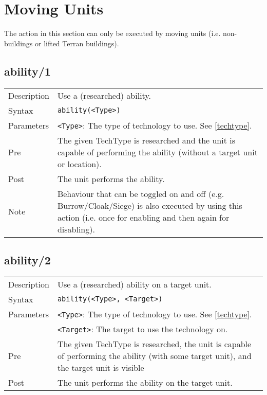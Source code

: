 \section{Moving Units}
The action in this section can only be executed by moving units (i.e. non-buildings or lifted Terran buildings).

\subsection{ability/1}
\begin{tabularx}{\textwidth}{lX}
 Description & Use a (researched) ability. \\
 Syntax & \verb|ability(<Type>)| \\
 Parameters & \verb|<Type>|: The type of technology to use. See \ref{techtype}. \\
 Pre & The given TechType is researched and the unit is capable of performing the ability (without a target unit or location). \\
 Post & The unit performs the ability. \\
 Note & Behaviour that can be toggled on and off (e.g. Burrow/Cloak/Siege) is also executed by using this action (i.e. once for enabling and then again for disabling).
\end{tabularx}

\subsection{ability/2}
\begin{tabularx}{\textwidth}{lX}
 Description & Use a (researched) ability on a target unit. \\
 Syntax & \verb|ability(<Type>, <Target>)| \\
 Parameters & \verb|<Type>|: The type of technology to use. See \ref{techtype}. \\
            & \verb|<Target>|: The target to use the technology on.\\
 Pre & The given TechType is researched, the unit is capable of performing the ability (with some target unit), and the target unit is visible \\
 Post & The unit performs the ability on the target unit.
\end{tabularx}

